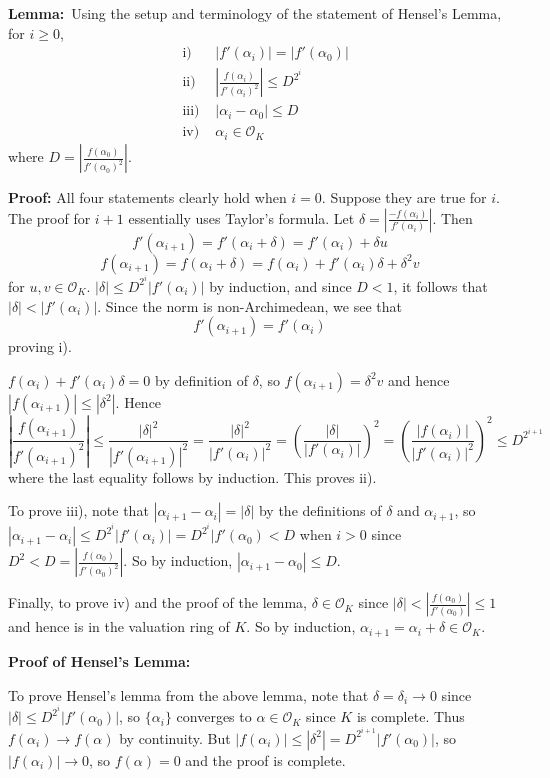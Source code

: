 \documentclass[12pt]{article}
\begin{document}
\textbf{Lemma:}\, Using the setup and terminology of the statement of Hensel's Lemma, for $i\geq 0$,
\begin{eqnarray*}
& \mbox{i) } & |f'(\alpha_i)| = |f'(\alpha_0)| \\
& \mbox{ii) } & \left|\frac{f(\alpha_i)}{f'(\alpha_i)^2}\right| \leq D^{2^i} \\
& \mbox{iii) } & | \alpha_i - \alpha_0 | \leq D \\
& \mbox{iv) } & \alpha_i \in \mathcal{O}_K
\end{eqnarray*}
where $ D=\left|\frac{f(\alpha_0)}{f'(\alpha_0)^2}\right|$.

\textbf{Proof:}
All four statements clearly hold when $i=0$. Suppose they are true for $i$. The proof for $i+1$ essentially uses Taylor's formula. Let $\delta = \left|\frac{-f(\alpha_i)}{f'(\alpha_i)}\right|$. Then
$$f'(\alpha_{i+1}) = f'(\alpha_i+\delta) = f'(\alpha_i) + {\delta}u$$
$$f(\alpha_{i+1}) = f(\alpha_i+\delta) = f(\alpha_i) + f'(\alpha_i)\delta + {\delta^2}v$$
for $u, v \in \mathcal{O}_K$. $|\delta| \leq D^{2^i}|f'(\alpha_i)|$ by induction, and since $D < 1$, it follows that $|\delta| < |f'(\alpha_i)|$. Since the norm is non-Archimedean, we see that $$f'(\alpha_{i+1}) = f'(\alpha_i)$$ proving i).

$f(\alpha_i)+f'(\alpha_i)\delta = 0$ by definition of $\delta$, so $f(\alpha_{i+1}) = {\delta^2}v$ and hence $|f(\alpha_{i+1})| \leq |\delta^2|$. Hence
$$\left|\frac{f(\alpha_{i+1})}{f'(\alpha_{i+1})^2}\right| \leq \frac{|\delta|^2}{|f'(\alpha_{i+1})|^2} = \frac{|\delta|^2}{|f'(\alpha_i)|^2}=\left(\frac{|\delta|}{|f'(\alpha_i)|}\right)^2 = \left(\frac{|f(\alpha_i)|}{|f'(\alpha_i)|^2}\right)^2 \leq D^{2^{i+1}}$$
where the last equality follows by induction. This proves ii).

To prove iii), note that $|\alpha_{i+1}-\alpha_i| = |\delta|$ by the definitions of $\delta$ and $\alpha_{i+1}$, so $|\alpha_{i+1}-\alpha_i| \leq D^{2^i}|f'(\alpha_i)| = D^{2^i}|f'(\alpha_0) < D$ when $i>0$ since $D^2 < D = \left|\frac{f(\alpha_0)}{f'(\alpha_0)^2}\right|$. So by induction, $|\alpha_{i+1}-\alpha_0| \leq D$.

Finally, to prove iv) and  the proof of the lemma, $\delta \in \mathcal{O}_K$ since $|\delta| < \left|\frac{f(\alpha_0)}{f'(\alpha_0)}\right| \leq 1$ and hence is in the valuation ring of $K$. So by induction, $\alpha_{i+1} = \alpha_i + \delta \in \mathcal{O}_K$.

\textbf{Proof of Hensel's Lemma:}

To prove Hensel's lemma from the above lemma, note that $\delta = \delta_i \to 0$ since $|\delta| \leq D^{2^i}|f'(\alpha_0)|$, so $\{\alpha_i\}$ converges to $\alpha \in \mathcal{O}_K$ since $K$ is complete. Thus $f(\alpha_i)\to f(\alpha)$ by continuity. But $|f(\alpha_i)| \leq |\delta^2| = D^{2^{i+1}}|f'(\alpha_0)|$, so $|f(\alpha_i)| \to 0$, so $f(\alpha)=0$ and the proof is complete.
\end{document}
